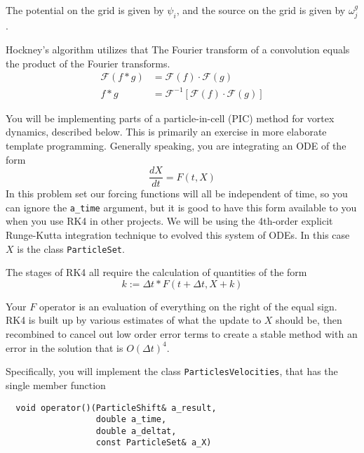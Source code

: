 \documentclass[11pt]{article}
\begin{document}
The potential on the grid is given by \( \psi_i \), and the source on the grid is given by \( \omega^g_j \).


Hockney's algorithm utilizes that The Fourier transform of a convolution equals the product of the Fourier transforms.
\begin{equation*}
    \begin{aligned}
        \mathcal{F} \left( f * g \right) & = \mathcal{F}(f) \cdot \mathcal{F}(g)                                 \\
        f * g                            & = \mathcal{F}^{-1} \left[ \mathcal{F}(f) \cdot \mathcal{F}(g) \right]
    \end{aligned}
\end{equation*}



\vspace{.5in}



You will be implementing parts of a particle-in-cell (PIC) method for vortex dynamics, described below. This is primarily an exercise in more elaborate template programming. Generally speaking, you are integrating an ODE of the form
\begin{equation}
    \frac{dX}{dt} = F(t, X)
\end{equation}
In this problem set our forcing functions will all be independent of time, so you can ignore the {\tt a\_time} argument, but it is good to have this form available to you when you use RK4 in other projects.
We will be using the 4th-order explicit Runge-Kutta integration technique to evolved this system of ODEs. In this case $X$ is the class {\tt ParticleSet}.

The stages of RK4 all require the calculation of quantities of the form
\begin{equation}
    k := \Delta t * F(t+\Delta t, X+ k)
\end{equation}

Your $F$ operator is an evaluation of everything on the right of the equal sign.  RK4 is built up by various estimates of what the update to $X$ should be, then recombined to cancel out low order error terms to create a stable method with an error in the solution that is $O(\Delta t)^4$.

Specifically, you will implement the class {\tt ParticlesVelocities}, that has the single member function
\begin{verbatim}
  void operator()(ParticleShift& a_result, 
                  double a_time, 
                  double a_deltat, 
                  const ParticleSet& a_X)
\end{verbatim}
\end{document}
